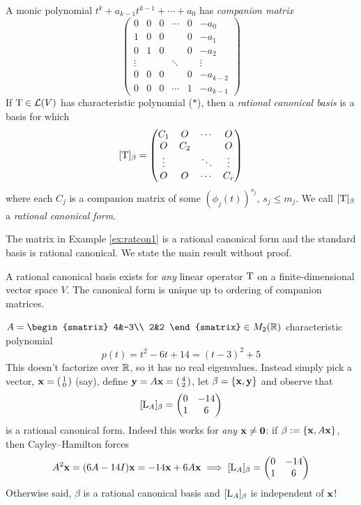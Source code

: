 \begin{defn}{}{}
	A monic polynomial $t^k+a_{k-1}t^{k-1}+\cdots+a_0$ has \emph{companion matrix}
	\[
		\begin{pmatrix}
			0 & 0 & 0 & \cdots & 0 & -a_0\\
			1 & 0 & 0 & & 0 & -a_1\\
			0 & 1 & 0 & & 0 & -a_2\\
			\vdots & & & \ddots & & \vdots\\
			0 & 0 & 0 & & 0 & -a_{k-2}\\
			0 & 0 & 0 & \cdots & 1 & -a_{k-1}
		\end{pmatrix}
		\tag{when $k=1$, this is the $1\times 1$ matrix $(-a_0)$}
	\]
	If $\mathrm{T}\in\mathcal{L}(V)$ has characteristic polynomial ($\ast$), then a \emph{rational canonical basis} is a basis for which
	\[
		[\mathrm{T}]_\beta=
		\begin{pmatrix}
			C_1&O&\cdots&O\\
			O&C_2&&O\\
			\vdots&&\ddots&\vdots\\
			O&O&\cdots&C_r
		\end{pmatrix}
	\]
	where each $C_j$ is a companion matrix of some $(\phi_j(t))^{s_j}$, $s_j\le m_j$. We call $[\mathrm{T}]_\beta$ a \emph{rational canonical form}.
\end{defn}

The matrix in Example \ref{ex:ratcon1} is a rational canonical form and the standard basis is rational canonical. We state the main result without proof.

\begin{thm}{}{}
	A rational canonical basis exists for \emph{any} linear operator $\mathrm{T}$ on a finite-dimensional vector space $V$. The canonical form is unique up to ordering of companion matrices.
\end{thm}


\begin{example}{}{}
	$A=
	\begin{smatrix}
		4&-3\\
		2&2
	\end{smatrix}
	\in M_2(\R)$  characteristic polynomial
	\[
		p(t)=t^2-6t+14=(t-3)^2+5
	\]
	This doesn't factorize over $\mathbb{R}$, so it has no real eigenvalues. Instead simply pick a vector, ${\mathbf{x}}=\left(\begin{smallmatrix}1\\0\end{smallmatrix}\right)$ (say), define ${\mathbf{y}}=A{\mathbf{x}}=\left(\begin{smallmatrix}4\\2\end{smallmatrix}\right)$, let $\beta=\{{\mathbf{x}},{\mathbf{y}}\}$ and observe that
	\[
		[\mathrm{L}_A]_\beta=
		\begin{pmatrix}
			0&-14\\
			1&6
		\end{pmatrix}
	\]
	is a rational canonical form. Indeed this works for \emph{any} ${\mathbf{x}}\neq\mathbf{0}$: if $\beta:=\{{\mathbf{x}},A{\mathbf{x}}\}$, then Cayley--Hamilton forces
	\[
		A^2{\mathbf{x}}=(6A-14I){\mathbf{x}}=-14{\mathbf{x}}+6A{\mathbf{x}}
		\implies  [\mathrm{L}_A]_\beta=
		\begin{pmatrix}
			0&-14\\
			1&6
		\end{pmatrix}
	\]
	Otherwise said, $\beta$ is a rational canonical basis and $[\mathrm{L}_A]_\beta$ is independent of ${\mathbf{x}}$!
\end{example}

